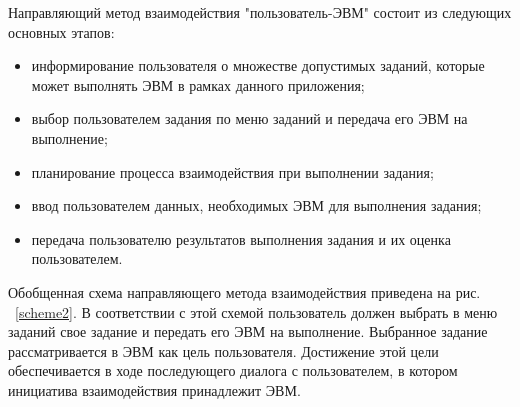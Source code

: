 Направляющий метод взаимодействия "пользователь-ЭВМ" состоит из следующих основных этапов:
\begin{itemize}
	\item информирование пользователя о множестве допустимых заданий, которые может выполнять ЭВМ в рамках данного приложения;
	\item выбор пользователем задания по меню заданий и передача его ЭВМ на выполнение;
	\item планирование процесса взаимодействия при выполнении задания;
	\item ввод пользователем данных, необходимых ЭВМ для выполнения задания;
	\item передача пользователю результатов выполнения задания и их оценка пользователем. 
\end{itemize}

Обобщенная схема направляющего метода взаимодействия приведена на рис. ~\ref{scheme2}. В соответствии с этой схемой пользователь должен выбрать в меню заданий свое задание и передать его ЭВМ на выполнение. Выбранное задание рассматривается в ЭВМ как цель пользователя. Достижение этой цели обеспечивается в ходе последующего диалога с пользователем, в котором инициатива взаимодействия принадлежит ЭВМ.

